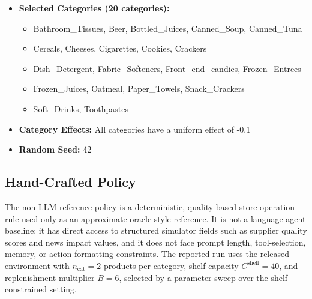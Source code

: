 \begin{itemize}
    \item \textbf{Selected Categories (20 categories):}
    \begin{itemize}
        \item Bathroom\_Tissues, Beer, Bottled\_Juices, Canned\_Soup, Canned\_Tuna
        \item Cereals, Cheeses, Cigarettes, Cookies, Crackers
        \item Dish\_Detergent, Fabric\_Softeners, Front\_end\_candies, Frozen\_Entrees
        \item Frozen\_Juices, Oatmeal, Paper\_Towels, Snack\_Crackers
        \item Soft\_Drinks, Toothpastes
    \end{itemize}
    
    \item \textbf{Category Effects:} All categories have a uniform effect of -0.1
    
    \item \textbf{Random Seed:} 42
\end{itemize}

\subsection{Hand-Crafted Policy}
\label{appendix:handcrafted_policy}

The non-LLM reference policy is a deterministic, quality-based store-operation rule used only as an approximate oracle-style reference. It is not a language-agent baseline: it has direct access to structured simulator fields such as supplier quality scores and news impact values, and it does not face prompt length, tool-selection, memory, or action-formatting constraints. The reported run uses the released environment with $n_{\mathrm{cat}}=2$ products per category, shelf capacity $C^{\mathrm{shelf}}=40$, and replenishment multiplier $B=6$, selected by a parameter sweep over the shelf-constrained setting.

